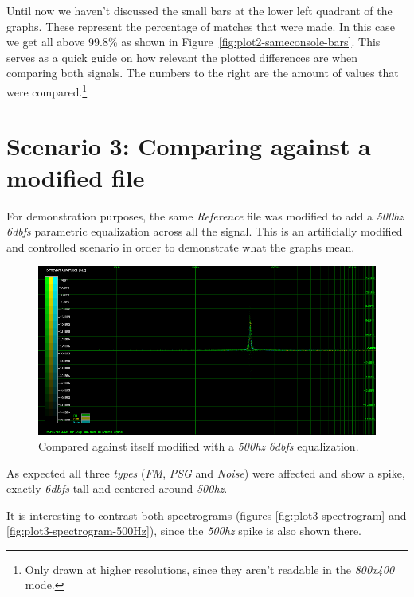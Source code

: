 \documentclass[10pt,a4paper]{report}
\newcommand{\hz}[1]{\textit{\mbox{#1\acrshort{hz}}}}
\newcommand{\db}[1]{\textit{\mbox{#1\acrshort{dbfs}}}}
\begin{document}
Until now we haven't discussed the small bars at the lower left quadrant of the graphs. These represent the percentage of matches that were made. In this case we get all above 99.8\% as shown in Figure~\ref{fig:plot2-sameconsole-bars}. This serves as a quick guide on how relevant the plotted differences are when comparing both signals. The numbers to the right are the amount of values that were compared.\footnote{Only drawn at higher resolutions, since they aren't readable in the \textit{800x400} mode.}

\section{Scenario 3: Comparing against a modified file}
\label{scenario3}

For demonstration purposes, the same \textit{Reference} file was modified to add a \hz{500} \db{6} parametric equalization across all the signal. This is an artificially modified and controlled scenario in order to demonstrate what the graphs mean.

\begin{figure}[H]
	\centering
	\includegraphics[width=1.0\linewidth]{images/interpretation/Plot3-Modified.png}
	\caption[1kHz modified]{Compared against itself modified with a \hz{500} \db{6} equalization.}
	\label{fig:plot3-modified}
\end{figure}

As expected all three \textit{types} (\textit{FM}, \textit{PSG} and \textit{Noise}) were affected and show a spike, exactly \db{6} tall and centered around \hz{500}.

It is interesting to contrast both spectrograms (figures \ref{fig:plot3-spectrogram} and \ref{fig:plot3-spectrogram-500Hz}), since the \hz{500} spike is also shown there.
\end{document}
